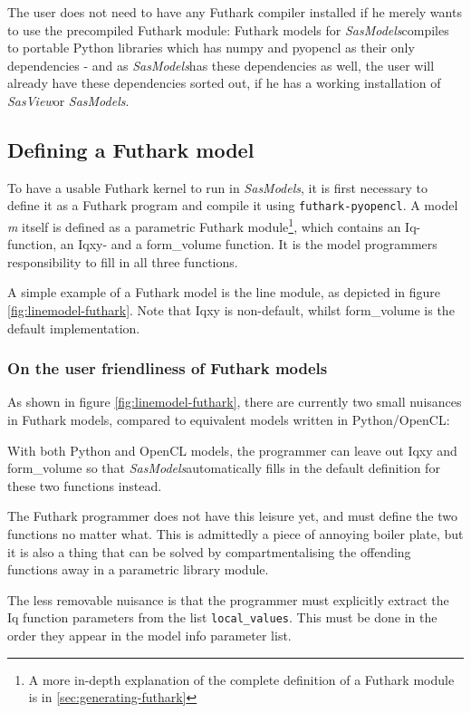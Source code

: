 \documentclass[11pt]{article}
\newcommand{\sasmodels}{\textit{SasModels}}
\newcommand{\sasview}{\textit{SasView}}
\begin{document}
The user does not need to have any Futhark compiler installed if he merely wants
to use the precompiled Futhark module: Futhark models for \sasmodels compiles to
portable Python libraries which has numpy and pyopencl as their only 
dependencies - and as \sasmodels has these dependencies as well, the user will
already have these dependencies sorted out, if he has a working installation of 
\sasview or \sasmodels.

\subsection{Defining a Futhark model}
\label{sec:defining-futhark-model}
To have a usable Futhark kernel to run in \sasmodels, it is first necessary to
define it as a Futhark program and compile it using \texttt{futhark-pyopencl}.
A model \textit{m} itself is defined as a parametric Futhark module\footnote{
  A more in-depth explanation of the complete definition of a Futhark module is 
  in \ref{sec:generating-futhark}},
which contains an Iq-function, an Iqxy- and a form\_volume function.
It is the model programmers responsibility to fill in all three functions.

A simple example of a Futhark model is the line module, 
as depicted in figure \ref{fig:linemodel-futhark}.
Note that Iqxy is non-default, whilst form\_volume is the default 
implementation.


\subsubsection{On the user friendliness of Futhark models}
As shown in figure \ref{fig:linemodel-futhark}, there are currently two small 
nuisances in Futhark models, compared to equivalent models written in
Python/OpenCL:

With both Python and OpenCL models, the programmer can leave out Iqxy and 
form\_volume so that \sasmodels automatically fills in the default definition
for these two functions instead.

The Futhark programmer does not have this leisure yet, and must define the two
functions no matter what. This is admittedly a piece of annoying boiler plate,
but it is also a thing that can be solved by compartmentalising the offending
functions away in a parametric library module.

The less removable nuisance is that the programmer must explicitly extract the
Iq function parameters from the list \texttt{local\_values}. This must be done
in the order they appear in the model info parameter list.
\end{document}
